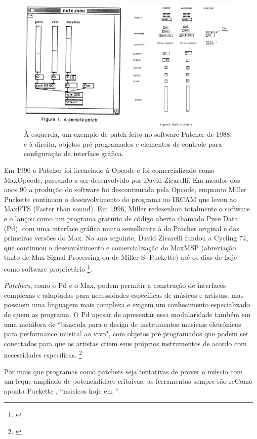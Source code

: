 \begin{figure}
    \caption{\label{patcher}À esquerda, um exemplo de patch feito no software Patcher de 1988, e à direita, objetos pré-programados e elementos de controle para configuração da interface gráfica.}
    
        \includegraphics[width=0.5\linewidth]{pictures/cap2/patcher}
    
\end{figure}


Em 1990 o Patcher foi licenciado à Opcode e foi comercializado como Max\/Opcode, passando a ser desenvolvido por David Zicarelli. Em meados dos anos 90 a produção do software foi descontinuada pela Opcode, enquanto Miller Puckette continuou o desenvolvimento do programa no IRCAM que levou ao Max\/FTS (Faster than sound). Em 1996, Miller redesenhou totalmente o software e o lançou como um programa gratuito de código aberto chamado Pure Data (Pd), com uma interface gráfica muito semelhante à do Patcher original e das primeiras versões do Max. No ano seguinte, David Zicarelli fundou a Cycling 74, que continuou o desenvolvimento e comercialização do Max\/MSP (abreviação tanto de Max Signal Processing ou de Miller S. Puckette) até os dias de hoje como software proprietário \footnote{\cite{Cryer2018}}.


\emph{Patchers}, como o Pd e o Max, podem permitir a construção de interfaces complexas e adaptadas para necessidades específicas de músicos e artistas, mas possuem uma linguagem mais complexa e exigem um conhecimento especializado de quem as programa. O Pd apesar de apresentar essa modularidade também em uma metáfora de ``bancada para o design de instrumentos musicais eletrônicos para performance musical ao vivo", com objetos pré programados que podem ser conectados para que os artistas criem seus próprios instrumentos de acordo com necessidades específicas. \footnote{\cite{PucketteMiller}}
 
Por mais que programas como patchers seja tentativas de prover o múscio com um leque ampliado de potencialidaes critaivas, as ferramentas sempre são reComo aponta Puckette \citeyear{PucketteMiller}, ``músicos hoje em ''


